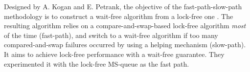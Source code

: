  Designed by A. Kogan and E. Petrank, the objective of
the fast-path-slow-path methodology is to construct a wait-free algorithm from a
lock-free one \cite{Kogan:2012:MCF:2370036.2145835}. The resulting algorithm
relies on a compare-and-swap-based lock-free algorithm \textit{most} of the time
(fast-path), and switch to a wait-free algorithm if too many compared-and-swap
failures occurred by using a helping mechanism (slow-path). It aims to achieve
lock-free performance with a wait-free guarantee. They experimented it with the
lock-free MS-queue as the fast path.
